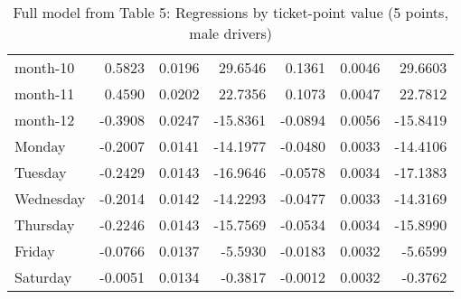 \documentclass[10pt]{article}
\begin{document}
\begin{table}[ht]
\begin{tabular}{lrrrrrr}
  month-10 & 0.5823 & 0.0196 & 29.6546 & 0.1361 & 0.0046 & 29.6603 \\ 
  month-11 & 0.4590 & 0.0202 & 22.7356 & 0.1073 & 0.0047 & 22.7812 \\ 
  month-12 & -0.3908 & 0.0247 & -15.8361 & -0.0894 & 0.0056 & -15.8419 \\ 
  Monday & -0.2007 & 0.0141 & -14.1977 & -0.0480 & 0.0033 & -14.4106 \\ 
  Tuesday & -0.2429 & 0.0143 & -16.9646 & -0.0578 & 0.0034 & -17.1383 \\ 
  Wednesday & -0.2014 & 0.0142 & -14.2293 & -0.0477 & 0.0033 & -14.3169 \\ 
  Thursday & -0.2246 & 0.0143 & -15.7569 & -0.0534 & 0.0034 & -15.8990 \\ 
  Friday & -0.0766 & 0.0137 & -5.5930 & -0.0183 & 0.0032 & -5.6599 \\ 
  Saturday & -0.0051 & 0.0134 & -0.3817 & -0.0012 & 0.0032 & -0.3762 \\ 
   \hline
\end{tabular}
\caption{Full model from Table 5: Regressions by ticket-point value (5 points, male drivers)} 
\label{tab_5_5_pts_no_age_M}
\end{table}


\clearpage
\pagebreak



\end{document}
